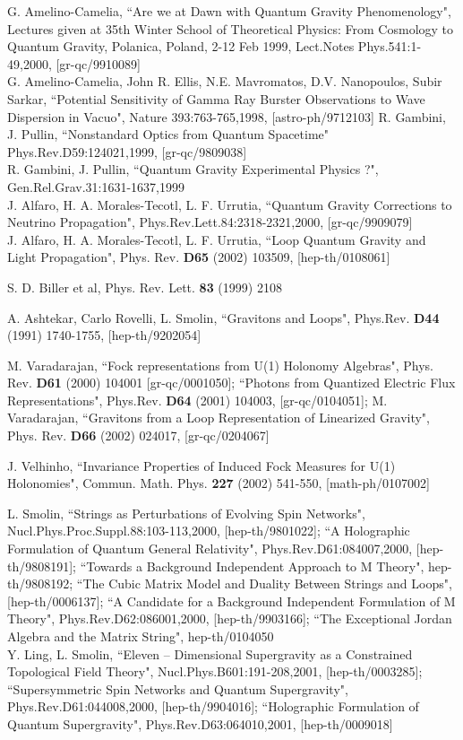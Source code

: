 \documentclass[12pt]{report}
\begin{document}
\begin{thebibliography}{99}
G. Amelino-Camelia, ``Are we at Dawn with Quantum Gravity Phenomenology",
Lectures given at 35th Winter School of Theoretical Physics: From
Cosmology to Quantum Gravity, Polanica, Poland, 2-12 Feb 1999,
Lect.Notes Phys.541:1-49,2000, [gr-qc/9910089]\\
G. Amelino-Camelia, John R. Ellis, N.E. Mavromatos, D.V. Nanopoulos,
Subir Sarkar, ``Potential Sensitivity of Gamma Ray Burster Observations
to Wave Dispersion in Vacuo", Nature 393:763-765,1998, [astro-ph/9712103]
R. Gambini, J. Pullin, ``Nonstandard Optics from Quantum Spacetime"
Phys.Rev.D59:124021,1999, [gr-qc/9809038]\\
R. Gambini, J. Pullin, ``Quantum Gravity Experimental Physics ?",
Gen.Rel.Grav.31:1631-1637,1999\\
J. Alfaro, H. A. Morales-Tecotl, L. F. Urrutia,
``Quantum Gravity Corrections to Neutrino Propagation",
Phys.Rev.Lett.84:2318-2321,2000, [gr-qc/9909079]\\
J. Alfaro, H. A. Morales-Tecotl, L. F. Urrutia,
``Loop Quantum Gravity and Light Propagation", 
Phys. Rev. {\bf D65} (2002) 103509, [hep-th/0108061]

 S. D. Biller et al, Phys. Rev. Lett. {\bf 83} (1999) 2108

 A. Ashtekar, Carlo Rovelli, L. Smolin,
``Gravitons and Loops", Phys.Rev. {\bf D44} (1991) 1740-1755, 
[hep-th/9202054]

 M. Varadarajan, ``Fock representations from U(1) Holonomy 
Algebras", Phys. Rev. {\bf D61} (2000) 104001 [gr-qc/0001050];
``Photons from Quantized Electric Flux Representations",
Phys.Rev. {\bf D64} (2001) 104003, [gr-qc/0104051];
M. Varadarajan, ``Gravitons from a Loop Representation of Linearized
Gravity", Phys. Rev. {\bf D66} (2002) 024017, [gr-qc/0204067]

 J. Velhinho, ``Invariance Properties of Induced Fock
Measures for U(1) Holonomies", Commun. Math. Phys. {\bf 227} 
(2002) 541-550, [math-ph/0107002]

L. Smolin, ``Strings as Perturbations of Evolving Spin Networks",
Nucl.Phys.Proc.Suppl.88:103-113,2000, [hep-th/9801022];
``A Holographic Formulation of Quantum General Relativity",
Phys.Rev.D61:084007,2000, [hep-th/9808191];
``Towards a Background Independent Approach to M Theory",
hep-th/9808192;
``The Cubic Matrix Model and Duality Between Strings and
Loops", [hep-th/0006137];
``A Candidate for a Background Independent Formulation of
M Theory", Phys.Rev.D62:086001,2000, [hep-th/9903166];
``The Exceptional Jordan Algebra and the Matrix String",
hep-th/0104050\\
Y. Ling, L. Smolin, ``Eleven -- Dimensional Supergravity as a Constrained
Topological Field Theory", Nucl.Phys.B601:191-208,2001, [hep-th/0003285];
``Supersymmetric Spin Networks and Quantum Supergravity",
Phys.Rev.D61:044008,2000, [hep-th/9904016];
``Holographic Formulation of Quantum Supergravity",
Phys.Rev.D63:064010,2001, [hep-th/0009018] 


\end{thebibliography}
\end{document}
